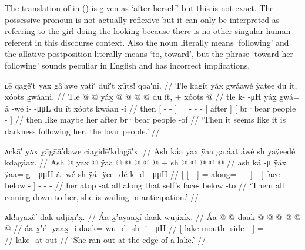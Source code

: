 The translation of  in (\lastx) is given as ‘after herself’ but this is not exact.
The possessive pronoun  is not actually reflexive but it can only be interpreted as referring to the girl doing the looking because there is no other singular human referent in this discourse context.
Also the noun  literally means ‘following’ and the allative postposition  literally means ‘to, toward’, but the phrase ‘toward her following’ sounds peculiar in English and has incorrect implications.

\ex\label{ex:89-44-dark-with-bears}%
%
\begingl
	\glpreamble	ʟē qag̣ê′t yᴀx g̣â′awe ỵatî′ duî′t x̣ūts! qoa′nî. //
	\glpreamble	Tle kag̱ít yáx̱ gwáawé ÿatee du ít, xóots ḵwáani. //
	\gla	Tle {}  @ {} @ {} yáx̱ {}
		 @ {} @ {}
		 @ {} @ {}
		{} du ít, {} +
		{} xóots  @ {} {} //
	\glb	tle {} k-  -μH yáx̱ {}
		gwá= á -wé
		i-  -μμL
		{} du ít {}
		{} xóots ḵwáan -í {} //
	\glc	then {}[ -  -  {}]
		=  -
		-  -
		{}[  after {}]
		{}[ br·bear people - {}] //
	\gld	then {}  {} {} like {}
		maybe\•  {}
		 {} {}
		{} her after {}
		{} br·bear people -of {} //
	\glft	‘Then it seems like it is darkness following her, the bear people.’
		//
\endgl
\xe

\ex\label{ex:89-45-wail-anticipation}%
%
\begingl
	\glpreamble	ᴀckā′ yᴀx ỵāg̣āā′dawe ciaỵidē′kdag̣ā′x. //
	\glpreamble	Ash káa yax̱ ÿaa g̱a.áat áwé sh yaÿeedé kdag̱áax̱. //
	\gla	{} {} Ash  @ {} {}
			yax̱ @ ÿaa @  @ {} @ {} @ {} {}
		 @ {} +
		{} sh  @ {} @ {} {}
		 @ {} @ {} @ {} //
	\glb	{} {} ash ká -μ {}
			ÿáx̱= ÿaa= g̱-  -μμH {} {}
		á -wé
		{} sh ÿá- ÿee -dé {}
		k- d-  -μμH //
	\glc	{}[ {}[   - {}]
			= along= -  - \· {}]
		 -
		{}[  face- below - {}]
		- -  - //
	\gld	{} {} her atop -at {}
			all along  {} {} \·that {}
		 {}
		{} self’s face- below -to {}
		 {} {} {} //
	\glft	‘Them all coming down to her, she is wailing in anticipation.’
		//
\endgl
\xe

\ex\label{ex:89-46-lakeshore}%
%
\begingl
	\glpreamble	ᴀk!ayaxê′ dāk udjix̣ī′x̣. //
	\glpreamble	Áa x̱ʼayaax̱í daak wujixíx. //
	\gla	{} Áa  @ {} @ {} {} 
		daak @  @ {} @ {} @ {} @ {} @ {} //
	\glb	{} áa x̱ʼé- yaax̱ -í {}
		daak= wu- d- sh- i-  -μH //
	\glc	{}[ lake mouth- side - {}]
		= - - - -  - //
	\gld	{} lake  {} -at {}
		out  {} {} {} {} {} //
	\glft	‘She ran out at the edge of a lake.’
		//
\endgl
\xe

